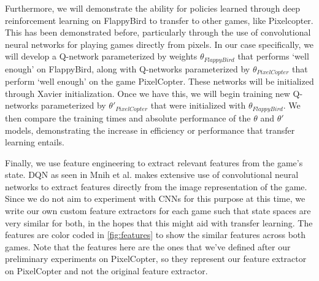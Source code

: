 \documentclass{article}
\begin{document}
Furthermore, we will demonstrate the ability for policies learned through deep reinforcement learning on FlappyBird to transfer to other games, like Pixelcopter.
This has been demonstrated before, particularly through the use of convolutional neural networks for playing games directly from pixels. \cite{deepmind}
In our case specifically, we will develop a Q-network parameterized by weights $\theta_{FlappyBird}$ that performs `well enough' on FlappyBird, along with Q-networks parameterized by $\theta_{PixelCopter}$ that perform `well enough' on the game PixelCopter.
These networks will be initialized through Xavier initialization. \cite{xavier}
Once we have this, we will begin training new Q-networks parameterized by $\theta'_{PixelCopter}$ that were initialized with $\theta_{FlappyBird}$.
We then compare the training times and absolute performance of the $\theta$ and $\theta'$ models, demonstrating the increase in efficiency or performance that transfer learning entails.

Finally, we use feature engineering to extract relevant features from the game's state. 
DQN as seen in Mnih et al. makes extensive use of convolutional neural networks to extract features directly from the image representation of the game.
Since we do not aim to experiment with CNNs for this purpose at this time, we write our own custom feature extractors for each game such that state spaces are very similar for both, in the hopes that this might aid with transfer learning.
The features are color coded in \ref{fig:features} to show the similar features across both games.
Note that the features here are the ones that we've defined after our preliminary experiments on PixelCopter, so they represent our feature extractor on PixelCopter and not the original feature extractor.
\end{document}
